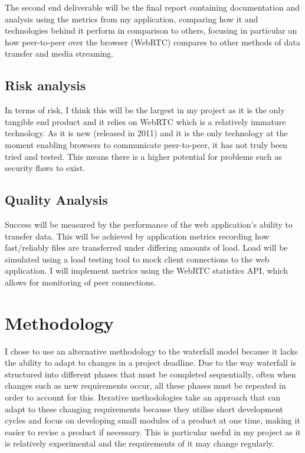 \documentclass[]{report}
\begin{document}
			The second end deliverable will be the final report containing documentation and analysis using the metrics	from my application, comparing how it and technologies behind it perform in comparison to others, focusing in particular on how peer-to-peer over the browser (WebRTC) compares to other methods of data transfer and media streaming.
			
			\subsection*{Risk analysis}
			In terms of risk, I think this will be the largest in my project as it is the only tangible end product and it relies on WebRTC which is a relatively immature technology. As it is new (released in 2011) and it is the only technology at the moment enabling browsers to communicate peer-to-peer, it has not truly been tried and tested. This means there is a higher potential for problems such as security flaws to exist. 
		
			\subsection*{Quality Analysis}
			Success will be measured by the performance of the web application's ability to transfer data. This will be achieved by application metrics recording how fast/reliably files are transferred under differing amounts of load. Load will be simulated using a load testing tool to mock client connections to the web application. I will implement metrics using the WebRTC statistics API, which allows for monitoring of peer connections.
			
	\section{Methodology}
		I chose to use an alternative methodology to the waterfall model because it lacks the ability to adapt to changes in a project deadline. Due to the way waterfall is structured into different phases that must be completed sequentially, often when changes such as new requirements occur, all these phases must be repeated in order to account for this. Iterative methodologies take an approach that can adapt to these changing requirements because they utilise short development cycles and focus on developing small modules of a product at one time, making it easier to revise a product if necessary. This is particular useful in my project as it is relatively experimental and the requirements of it may change regularly. 
		
\end{document}
